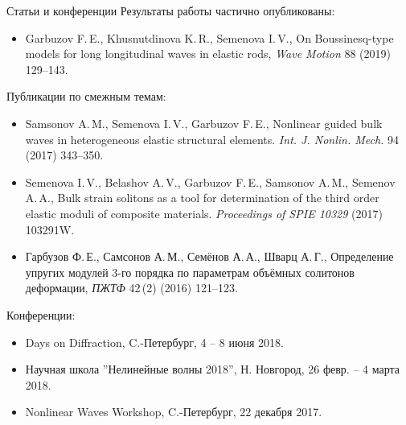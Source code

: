 \documentclass[usenames,dvipsnames]{beamer}
\begin{document}
\begin{frame}{Статьи и конференции}
\small
Результаты работы частично опубликованы:
\footnotesize
\begin{itemize}
	\item Garbuzov F.\,E., Khusnutdinova K.\,R., Semenova I.\,V., On Boussinesq-type models for long longitudinal waves in elastic rods, \textit{Wave Motion} 88 (2019) 129--143.
\end{itemize}
\small
Публикации по смежным темам:
\footnotesize
\begin{itemize}
	\item Samsonov A.\,M., Semenova I.\,V., Garbuzov F.\,E.,  Nonlinear guided bulk waves in heterogeneous elastic structural elements. \textit{Int. J. Nonlin. Mech.} 94 (2017) 343--350.
	\item Semenova I.\,V., Belashov A.\,V., Garbuzov F.\,E., Samsonov A.\,M., Semenov A.\,A., Bulk strain solitons as a tool for determination of the third order elastic moduli of composite materials. \textit{Proceedings of SPIE 10329} (2017) 103291W.
	\item Гарбузов Ф.\,Е., Самсонов А.\,М., Семёнов А.\,А., Шварц А.\,Г., Определение упругих модулей	3-го порядка по параметрам объёмных солитонов деформации, \textit{ПЖТФ} 42\,(2) (2016) 121--123.
\end{itemize}
\small
Конференции:
\footnotesize
\begin{itemize}
	\item Days on Diffraction, C.-Петербург, 4 -- 8 июня 2018.
	\item Научная школа ''Нелинейные волны 2018'', Н. Новгород, 26 февр. -- 4 марта 2018.
	\item Nonlinear Waves Workshop, C.-Петербург, 22 декабря 2017.
\end{itemize}
\end{frame}



\appendix
\end{document}
